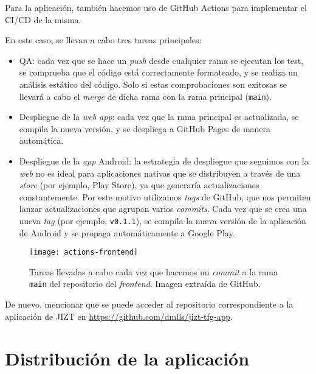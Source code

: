 Para la aplicación, también hacemos uso de GitHub Actions para implementar el CI/CD de la misma.

En este caso, se llevan a cabo tres tareas principales:

\vspace{-0.3cm}
\begin{itemize} [\textbullet]
	\item QA: cada vez que se hace un \emph{push} desde cualquier rama se ejecutan los test, se comprueba que el código está correctamente formateado, y se realiza un análisis estático del código. Solo si estas comprobaciones son exitosas se llevará a cabo el \emph{merge} de dicha rama con la rama principal (\texttt{main}).
	
	\item Despliegue de la \emph{web app}: cada vez que la rama principal es actualizada, se compila la nueva versión, y se despliega a GitHub Pages de manera automática.
	
	\item Despliegue de la \emph{app} Android: la estrategia de despliegue que seguimos con la \emph{web} no es ideal para aplicaciones nativas que se distribuyen a través de una \emph{store} (por ejemplo, Play Store), ya que generaría actualizaciones constantemente. Por este motivo utilizamos \emph{tags} de GitHub, que nos permiten lanzar actualizaciones que agrupan varios \emph{commits}. Cada vez que se crea una nueva \emph{tag} (por ejemplo, \texttt{v0.1.1}), se compila la nueva versión de la aplicación de Android y se propaga automáticamente a Google Play.
\end{itemize}

\begin{figure}[h!]
	\centering
	\texttt{[image: actions-frontend]}
	\caption[GitHub Actions en el \emph{frontend}.]{Tareas llevadas a cabo cada vez que hacemos un \emph{commit} a la rama \texttt{main} del repositorio del \emph{frontend}. Imagen extraída de GitHub.}
\end{figure}

De nuevo, mencionar que se puede acceder al repositorio correspondiente a la aplicación de JIZT en \href{https://github.com/dmlls/jizt-tfg-app}{https://github.com/dmlls/jizt-tfg-app}.

\bigskip

\section{Distribución de la aplicación}

